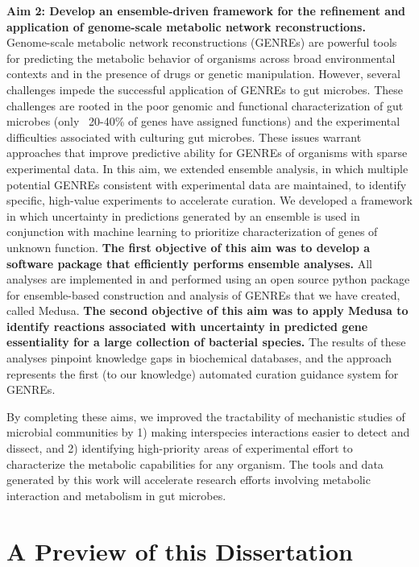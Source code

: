 \documentclass[11pt,twocolumn,notitlepage,openany,twoside]{book}
\begin{document}
\begin{refsection}
\textbf{Aim 2: Develop an ensemble-driven framework for the refinement and application of genome-scale metabolic network reconstructions.} Genome-scale metabolic network reconstructions (GENREs) are powerful tools for predicting the metabolic behavior of organisms across broad environmental contexts and in the presence of drugs or genetic manipulation. However, several challenges impede the successful application of GENREs to gut microbes. These challenges are rooted in the poor genomic and functional characterization of gut microbes (only ~20-40\% of genes have assigned functions) and the experimental difficulties associated with culturing gut microbes. These issues warrant approaches that improve predictive ability for GENREs of organisms with sparse experimental data. In this aim, we extended ensemble analysis, in which multiple potential GENREs consistent with experimental data are maintained, to identify specific, high-value experiments to accelerate curation. We developed a framework in which uncertainty in predictions generated by an ensemble is used in conjunction with machine learning to prioritize characterization of genes of unknown function. \textbf{The first objective of this aim was to develop a software package that efficiently performs ensemble analyses.} All analyses are implemented in and performed using an open source python package for ensemble-based construction and analysis of GENREs that we have created, called Medusa. \textbf{The second objective of this aim was to apply Medusa to identify reactions associated with uncertainty in predicted gene essentiality for a large collection of bacterial species.} The results of these analyses pinpoint knowledge gaps in biochemical databases, and the approach represents the first (to our knowledge) automated curation guidance system for GENREs.

By completing these aims, we improved the tractability of mechanistic studies of microbial communities by 1) making interspecies interactions easier to detect and dissect, and 2) identifying high-priority areas of experimental effort to characterize the metabolic capabilities for any organism. The tools and data generated by this work will accelerate research efforts involving metabolic interaction and metabolism in gut microbes.

\section{A Preview of this Dissertation}


\end{refsection}
\end{document}

